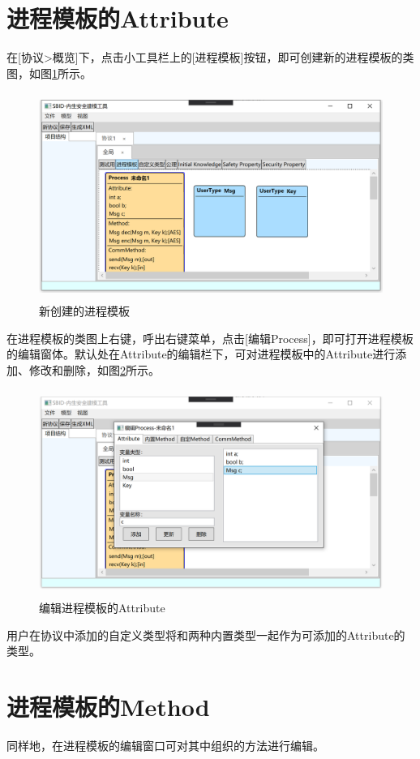 \section{进程模板的Attribute}
在[协议>概览]下，点击小工具栏上的[进程模板]按钮，即可创建新的进程模板的类图，如图\ref{create_process}所示。
	\begin{figure}[h]
	\centering
	\includegraphics[width=12cm,height=6.75cm]{imgs/create_process.png}
	\caption{新创建的进程模板}
	\label{create_process}
	\end{figure}
\par
在进程模板的类图上右键，呼出右键菜单，点击[编辑Process]，即可打开进程模板的编辑窗体。默认处在Attribute的编辑栏下，可对进程模板中的Attribute进行添加、修改和删除，如图\ref{process_edit_attribute}所示。
    \begin{figure}[h]
	\centering
	\includegraphics[width=12cm,height=6.75cm]{imgs/process_edit_attribute.png}
	\caption{编辑进程模板的Attribute}
	\label{process_edit_attribute}
	\end{figure}
\par
用户在协议中添加的自定义类型将和两种内置类型一起作为可添加的Attribute的类型。

\section{进程模板的Method}
同样地，在进程模板的编辑窗口可对其中组织的方法进行编辑。
